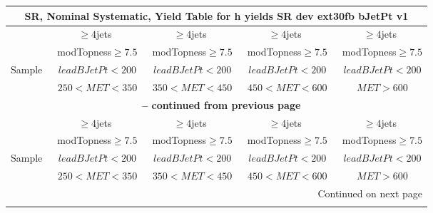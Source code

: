 \documentclass{article}
\begin{document}
\begin{longtable}{|l|c|c|c|c|} 
 
\multicolumn{5}{c}{ SR, Nominal Systematic, Yield Table for h yields SR dev ext30fb bJetPt v1 }\\* \hline 
  & $\ge4$jets  & $\ge4$jets  & $\ge4$jets  & $\ge4$jets \\* 
  & ~modTopness$\ge7.5$  & ~modTopness$\ge7.5$  & ~modTopness$\ge7.5$  & ~modTopness$\ge7.5$ \\* 
Sample  & ~$leadBJetPt<200$  & ~$leadBJetPt<200$  & ~$leadBJetPt<200$  & ~$leadBJetPt<200$ \\* 
  & ~$250<MET<350$  & ~$350<MET<450$  & ~$450<MET<600$  & ~$MET>600$ \\* 
\hline \hline 
\endfirsthead 
 
\multicolumn{5}{c}{{\bfseries \tablename\ \thetable{} -- continued from previous page}}\\* \hline 
  & $\ge4$jets  & $\ge4$jets  & $\ge4$jets  & $\ge4$jets \\* 
  & ~modTopness$\ge7.5$  & ~modTopness$\ge7.5$  & ~modTopness$\ge7.5$  & ~modTopness$\ge7.5$ \\* 
Sample  & ~$leadBJetPt<200$  & ~$leadBJetPt<200$  & ~$leadBJetPt<200$  & ~$leadBJetPt<200$ \\* 
  & ~$250<MET<350$  & ~$350<MET<450$  & ~$450<MET<600$  & ~$MET>600$ \\* 
\hline \hline 
\endhead 
 
\multicolumn{5}{|r|}{{Continued on next page}}\\* \hline 
\endfoot 
 
 
\endlastfoot 
 

\end{longtable}
\end{document}
